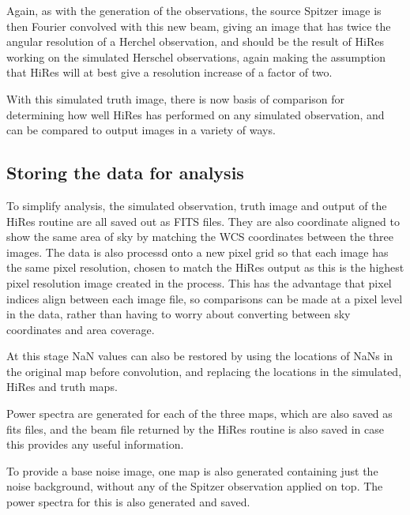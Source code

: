 Again, as with the generation of the observations, the source Spitzer image is then Fourier convolved with this new beam, giving an image that has twice the angular resolution of a Herchel observation, and should be the result of HiRes working on the simulated Herschel observations, again making the assumption that HiRes will at best give a resolution increase of a factor of two.

With this simulated truth image, there is now basis of comparison for determining how well HiRes has performed on any simulated observation, and can be compared to output images in a variety of ways.

\subsection{Storing the data for analysis}

To simplify analysis, the simulated observation, truth image and output of the HiRes routine are all saved out as FITS files. They are also coordinate aligned to show the same area of sky by matching the WCS coordinates between the three images. The data is also processd onto a new pixel grid so that each image has the same pixel resolution, chosen to match the HiRes output as this is the highest pixel resolution image created in the process. This has the advantage that pixel indices align between each image file, so comparisons can be made at a pixel level in the data, rather than having to worry about converting between sky coordinates and area coverage.

At this stage NaN values can also be restored by using the locations of NaNs in the original map before convolution, and replacing the locations in the simulated, HiRes and truth maps.

Power spectra are generated for each of the three maps, which are also saved as fits files, and the beam file returned by the HiRes routine is also saved in case this provides any useful information.

To provide a base noise image, one map is also generated containing just the noise background, without any of the Spitzer observation applied on top. The power spectra for this is also generated and saved.
